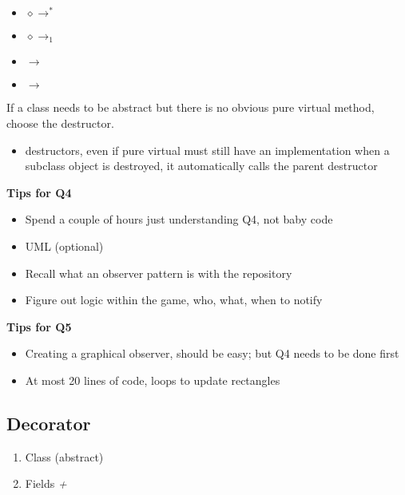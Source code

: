 \begin{itemize}
    \item {} $ \diamond\rightarrow^* $ 
    \item {} $ \diamond \rightarrow_1 $ 
    \item {} $ \rightarrow $ 
    \item {} $ \rightarrow $ 
\end{itemize}

If a class needs to be abstract but there is no obvious pure virtual method, choose
the destructor.
\begin{itemize}
    \item destructors, even if pure virtual must still have an implementation
          \subitem when a subclass object is destroyed, it automatically calls the parent
          destructor
\end{itemize}


\textbf{Tips for Q4}
\begin{itemize}
    \item Spend a couple of hours just understanding Q4, not baby code
    \item UML (optional)
    \item Recall what an observer pattern is with the repository
    \item Figure out logic within the game, who, what, when to notify
\end{itemize}

\textbf{Tips for Q5}
\begin{itemize}
    \item Creating a graphical observer, should be easy; but Q4
          needs to be done first
    \item At most 20 lines of code,  loops to update rectangles
\end{itemize}

\subsection{Decorator}

\begin{enumerate}[(1)]
    \item Class
          \subitem {} (abstract)
    \item Fields
          \subitem \emph{+}
\end{enumerate}

